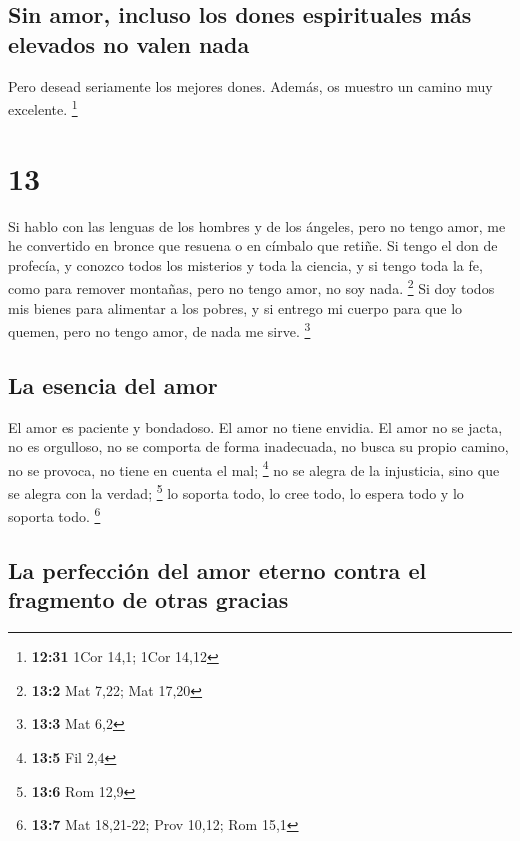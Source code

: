 \hypertarget{sin-amor-incluso-los-dones-espirituales-muxe1s-elevados-no-valen-nada}{%
\subsection{Sin amor, incluso los dones espirituales más elevados no
valen
nada}\label{sin-amor-incluso-los-dones-espirituales-muxe1s-elevados-no-valen-nada}}

 Pero desead seriamente los mejores dones. Además, os
muestro un camino muy excelente. \footnote{\textbf{12:31} 1Cor 14,1;
  1Cor 14,12}

\hypertarget{section-12}{%
\section{13}\label{section-12}}

 Si hablo con las lenguas de los hombres y de los ángeles,
pero no tengo amor, me he convertido en bronce que resuena o en címbalo
que retiñe.  Si tengo el don de profecía, y conozco todos
los misterios y toda la ciencia, y si tengo toda la fe, como para
remover montañas, pero no tengo amor, no soy nada. \footnote{\textbf{13:2}
  Mat 7,22; Mat 17,20}  Si doy todos mis bienes para
alimentar a los pobres, y si entrego mi cuerpo para que lo quemen, pero
no tengo amor, de nada me sirve. \footnote{\textbf{13:3} Mat 6,2}

\hypertarget{la-esencia-del-amor}{%
\subsection{La esencia del amor}\label{la-esencia-del-amor}}

 El amor es paciente y bondadoso. El amor no tiene
envidia. El amor no se jacta, no es orgulloso,  no se
comporta de forma inadecuada, no busca su propio camino, no se provoca,
no tiene en cuenta el mal; \footnote{\textbf{13:5} Fil 2,4}
 no se alegra de la injusticia, sino que se alegra con la
verdad; \footnote{\textbf{13:6} Rom 12,9}  lo soporta
todo, lo cree todo, lo espera todo y lo soporta todo. \footnote{\textbf{13:7}
  Mat 18,21-22; Prov 10,12; Rom 15,1}

\hypertarget{la-perfecciuxf3n-del-amor-eterno-contra-el-fragmento-de-otras-gracias}{%
\subsection{La perfección del amor eterno contra el fragmento de otras
gracias}\label{la-perfecciuxf3n-del-amor-eterno-contra-el-fragmento-de-otras-gracias}}

